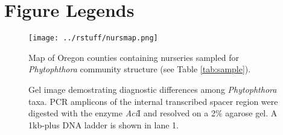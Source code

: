 \documentclass[12pt]{article}
\begin{document}
\renewcommand\refname{Literature Cited}


\clearpage

\section*{Figure Legends}






\begin{figure}[!ht]
\begin{center}
\texttt{[image: ../rstuff/nursmap.png]}
\end{center}
\caption{
Map of Oregon counties containing nurseries sampled for \emph{Phytophthora} community structure (see Table \ref{tab:sample}).
}
\label{fig:map}
\end{figure}
\clearpage

\begin{figure}[!ht]
\begin{center}
\end{center}
\caption{
Gel image demostrating diagnostic differences among \emph{Phytophthora} taxa. PCR amplicons of the internal transcribed spacer region were digested with the enzyme \emph{Aci}I and resolved on a 2\% agarose gel.  A 1kb-plus DNA ladder is shown in lane 1.
}
\label{fig:gel}
\end{figure}
\clearpage
\end{document}
